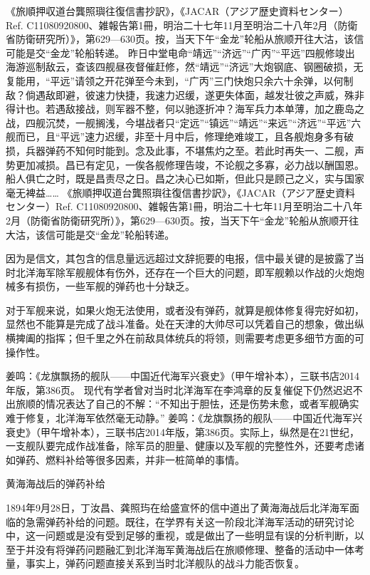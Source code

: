 \documentclass[12pt,UTF8]{ctexbook}
\begin{document}
《旅順押収道台龔照璵往復信書抄訳》，《JACAR（アジア歴史資料センター）Ref. C11080920800、雑報告第1冊，明治二十七年11月至明治二十八年2月（防衛省防衛研究所）》，第629—630页。按，当天下午“金龙”轮船从旅顺开往大沽，该信可能是交“金龙”轮船转递。
昨日中堂电命“靖远”“济远”“广丙”“平远”四舰修竣出海游巡制敌云，查该四舰昼夜督催赶修，然“靖远”“济远”大炮钢底、钢圈破损，无复能用，“平远”请领之开花弹至今未到，“广丙”三门快炮只余六十余弹，以何制敌？倘遇敌即避，彼速力快捷，我速力迟缓，遂更失体面，越发壮彼之声威，殊非得计也。若遇敌接战，则军器不整，何以驰逐折冲？海军兵力本单薄，加之鹿岛之战，四舰沉焚，一舰搁浅，今堪战者只“定远”“镇远”“靖远”“来远”“济远”“平远”六舰而已，且“平远”速力迟缓，非至十月中后，修理绝难竣工，且各舰炮身多有破损，兵器弹药不知何时能到。念及此事，不堪焦灼之至。若此时再失一、二舰，声势更加减损。昌已有定见，一俟各舰修理告竣，不论舰之多寡，必力战以酬国恩。船人俱亡之时，既是昌责尽之日。昌之决心已如斯，但此只是顾己之义，实与国家毫无裨益…… 《旅順押収道台龔照璵往復信書抄訳》，《JACAR（アジア歴史資料センター）Ref. C11080920800、雑報告第1冊，明治二十七年11月至明治二十八年2月（防衛省防衛研究所）》，第629—630页。按，当天下午“金龙”轮船从旅顺开往大沽，该信可能是交“金龙”轮船转递。

因为是信文，其包含的信息量远远超过文辞扼要的电报，信中最关键的是披露了当时北洋海军除军舰舰体有伤外，还存在一个巨大的问题，即军舰赖以作战的火炮炮械多有损伤，一些军舰的弹药也十分缺乏。

对于军舰来说，如果火炮无法使用，或者没有弹药，就算是舰体修复得完好如初，显然也不能算是完成了战斗准备。处在天津的大帅尽可以凭着自己的想象，做出纵横捭阖的指挥；但千里之外在前敌具体统兵的将领，则需要考虑更多细节方面的可操作性。

姜鸣：《龙旗飘扬的舰队——中国近代海军兴衰史》（甲午增补本），三联书店2014年版，第386页。
现代有学者曾对当时北洋海军在李鸿章的反复催促下仍然迟迟不出旅顺的情况表达了自己的不解：“不知出于胆怯，还是伤势未愈，或者军舰确实难于修复，北洋海军依然毫无动静。” 姜鸣：《龙旗飘扬的舰队——中国近代海军兴衰史》（甲午增补本），三联书店2014年版，第386页。实际上，纵然是在21世纪，一支舰队要完成作战准备，除军员的胆量、健康以及军舰的完整性外，还要考虑诸如弹药、燃料补给等很多因素，并非一桩简单的事情。

黄海海战后的弹药补给

1894年9月28日，丁汝昌、龚照玙在给盛宣怀的信中道出了黄海海战后北洋海军面临的急需弹药补给的问题。既往，在学界有关这一阶段北洋海军活动的研究讨论中，这一问题或是没有受到足够的重视，或是做出了一些明显有误的分析判断，以至于并没有将弹药问题融汇到北洋海军黄海战后在旅顺修理、整备的活动中一体考量，事实上，弹药问题直接关系到当时北洋舰队的战斗力能否恢复。
\end{document}
